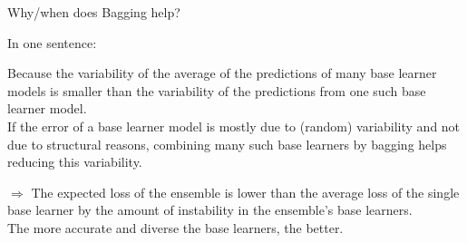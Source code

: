 \begin{vbframe}{Why/when does Bagging help?}

In one sentence:\\
\lz

Because the variability of the average of the predictions of many base learner models is smaller than the variability of the predictions from one such base learner model.\\

If the error of a base learner model is mostly due to (random) variability and not due to structural reasons, combining many such base learners by bagging helps reducing this variability.


\framebreak
{}
\small
$\Rightarrow$ The expected loss of the ensemble is lower than the average loss of the single base learner by the amount of instability in the ensemble's base learners.\\ The more accurate and diverse the base learners, the better.
\normalsize
\framebreak
\end{vbframe}

